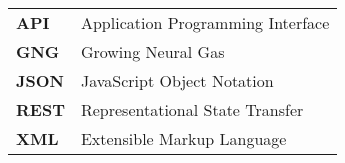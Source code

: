 \begingroup
\newcommand{\abkskip}{0.8ex}

\begin{center}
\begin{tabularx}{\textwidth}{>{\bfseries}lX}
API     & Application Programming Interface \\[\abkskip]
GNG     & Growing Neural Gas \\[\abkskip]
JSON    & JavaScript Object Notation \\[\abkskip]
REST    & Representational State Transfer \\[\abkskip]
XML     & Extensible Markup Language \\[\abkskip]
\end{tabularx}
\end{center}
\endgroup
